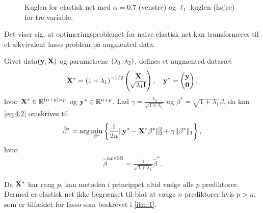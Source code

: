 \begin{figure}[H]
\centering
\caption{Kuglen for elastisk net med \(\alpha=0.7\) (venstre) og \(\ell_1\) kuglen (højre) for tre variable.}
\label{fig:elastisk_net}
\end{figure}
%
Det viser sig, at optimeringsproblemet for naive elastisk net kan transformeres til et ækvivalent lasso problem på augmented data.
%
\begin{lem} \label{lem:elastisk_net}
Givet data\(\del{\y, \X}\) og parametrene \(\del{\lambda_1, \lambda_2}\), defines et augmented datasæt 
\begin{align*}
\X^* = \del{1 + \lambda_1}^{-1/2} \begin{pmatrix}
\X \\ \sqrt{\lambda_1 \mathbf{I}}
\end{pmatrix}, \quad \y^* = \begin{pmatrix}
\y \\ \mathbf{0}
\end{pmatrix},
\end{align*}
hvor \(\X^* \in \mathbb{R}^{\del{n+p} \times p}\) og \(\mathbf{y}^* \in \mathbb{R}^{n+p}\).
Lad \(\gamma = \frac{\lambda_2}{\sqrt{1+\lambda_1}}\) og \(\beta^* = \sqrt{1+\lambda_1} \beta\), da kan \eqref{eq:4.2} omskrives til
\begin{align*}
\hat{\beta}^* = \arg \min_{\beta^*} \cbr{\frac{1}{2n} \Vert \y^* - \X^* \beta^* \Vert_2^2 +\gamma \Vert \beta^* \Vert_1},
\end{align*}
hvor
\begin{align*}
\hat{\beta}^\text{naivEN} = \frac{1}{\sqrt{1+\lambda_1}} \hat{\beta}^*.
\end{align*}
\end{lem}
%
Da \(\mathbf{X}^*\) har rang \(p\), kan metoden i princippet altid vælge alle \(p\) prediktorer.
Dermed er elastisk net ikke begrænset til blot at vælge \(n\) prediktorer hvis \(p > n\), som er tilfældet for lasso som beskrevet i \ref{itm:1}.
